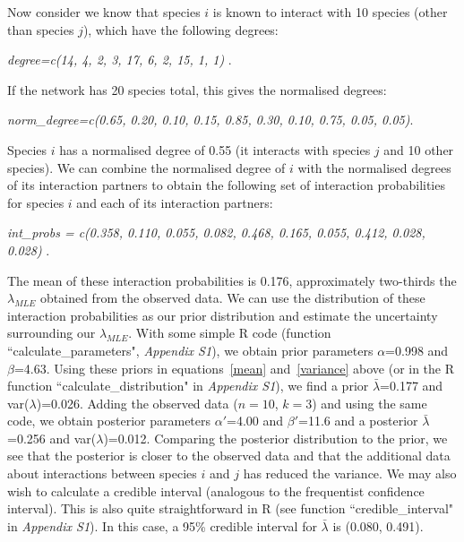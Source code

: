 \documentclass[12pt]{article}
\begin{document}
\begin{spacing}{2.0}
  Now consider we know that species $i$ is known to interact with 10 species (other than species $j$), which have the following degrees:

    \vspace{12pt}
    \noindent\emph{
      degree=c(14, 4, 2, 3, 17, 6, 2, 15, 1, 1)
        }.
      \vspace{12pt}

    If the network has 20 species total, this gives the normalised degrees:

    \vspace{12pt}
    \noindent\emph{
      norm\_degree=c(0.65, 0.20, 0.10, 0.15, 0.85, 0.30, 0.10, 0.75, 0.05, 0.05)}.
      \vspace{12pt}

    Species $i$ has a normalised degree of 0.55 (it interacts with species $j$ and 10 other species). We can combine the normalised degree of $i$ with the normalised degrees of its interaction partners to obtain the following set of interaction probabilities for species $i$ and each of its interaction partners:

    \vspace{12pt}
    \noindent\emph{
       int\_probs = c(0.358, 0.110, 0.055, 0.082, 0.468, 0.165, 0.055, 0.412, 0.028, 0.028) }.
      \vspace{12pt}

    The mean of these interaction probabilities is 0.176, approximately two-thirds the $\lambda_{MLE}$ obtained from the observed data. We can use the distribution of these interaction probabilities as our prior distribution and estimate the uncertainty surrounding our $\lambda_{MLE}$. With some simple R code (function ``calculate\_parameters", \emph{Appendix S1}), we obtain prior parameters $\alpha$=0.998 and $\beta$=4.63. Using these priors in equations~\ref{mean} and~\ref{variance} above (or in the R function ``calculate\_distribution" in \emph{Appendix S1}), we find a prior $\bar\lambda$=0.177 and var($\lambda$)=0.026. Adding the observed data ($n=10$, $k=3$) and using the same code, we obtain posterior parameters $\alpha'$=4.00 and $\beta'$=11.6 and a posterior $\bar\lambda$=0.256 and var($\lambda$)=0.012. Comparing the posterior distribution to the prior, we see that the posterior is closer to the observed data and that the additional data about interactions between species $i$ and $j$ has reduced the variance. We may also wish to calculate a credible interval (analogous to the frequentist confidence interval). This is also quite straightforward in R (see function ``credible\_interval" in \emph{Appendix S1}). In this case, a 95\% credible interval for $\bar\lambda$ is (0.080, 0.491).



\end{spacing}
\end{document}
